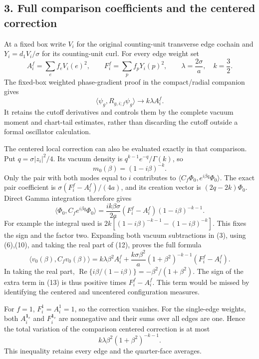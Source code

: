 \documentclass[
  11pt,
]{article}
\begin{document}
\subsection{3. Full comparison coefficients and the centered
correction}\label{weak-coupling-part-12-full-comparison-coefficients-and-the-centered-correction}

At a fixed box write \(V_i\) for the original counting-unit transverse
edge cochain and \(Y_i=d_1V_i/\sigma\) for its counting-unit curl. For
every edge weight set \[
 A_i^f=\sum_ef_eV_i(e)^2,\qquad
 F_i^f=\sum_pf_pY_i(p)^2,\qquad
 \lambda=\frac{2\sigma}{a},\quad k=\frac32 .
 \tag{9}
\] The fixed-box weighted phase-gradient proof in the compact/radial
companion gives \[
 \langle\psi_g,R_{g,i;f}\psi_g\rangle
                       \longrightarrow k\lambda A_i^f .
 \tag{10}
\] It retains the cutoff derivatives and controls them by the complete
vacuum moment and chart-tail estimates, rather than discarding the
cutoff outside a formal oscillator calculation.

The centered local correction can also be evaluated exactly in that
comparison. Put \(q=\sigma|z_i|^2/4\). Its vacuum density is
\(q^{k-1}e^{-q}/\Gamma(k)\), so \[
 m_0(\beta)=(1-i\beta)^{-k}.
 \tag{11}
\] Only the pair with both modes equal to \(i\) contributes to
\(\langle C_f\Phi_0,e^{i\beta q}\Phi_0\rangle\). The exact pair
coefficient is \(\sigma(F_i^f-A_i^f)/(4a)\), and its creation vector is
\((2q-2k)\Phi_0\). Direct Gamma integration therefore gives \[
 \langle\Phi_0,C_f e^{i\beta q}\Phi_0\rangle
 =\frac{ik\beta\sigma}{2a}(F_i^f-A_i^f)
                                      (1-i\beta)^{-k-1}.
 \tag{12}
\] For example the integral used is
\(2k[(1-i\beta)^{-k-1}-(1-i\beta)^{-k}]\). This fixes the sign and the
factor two. Expanding both vacuum subtractions in (3), using (6),(10),
and taking the real part of (12), proves the full formula \[
 \boxed{\langle v_0(\beta),C_fv_0(\beta)\rangle
   =k\lambda\beta^2 A_i^f+
       \frac{k\sigma\beta^2}{a}
          (1+\beta^2)^{-k-1}(F_i^f-A_i^f).}
 \tag{13}
\] In taking the real part, \(\operatorname{Re}\{i\beta/(1-i\beta)\}
 =-\beta^2/(1+\beta^2)\). The sign of the extra term in (13) is thus
positive times \(F_i^f-A_i^f\). This term would be missed by identifying
the centered and uncentered configuration measures.

For \(f=1\), \(F_i^1=A_i^1=1\), so the correction vanishes. For the
single-edge weights, both \(A_i^{\mathbf1_e}\) and \(F_i^{\mathbf1_e}\)
are nonnegative and their sums over all edges are one. Hence the total
variation of the comparison centered correction is at most \[
 k\lambda\beta^2(1+\beta^2)^{-k-1}.
 \tag{14}
\] This inequality retains every edge and the quarter-face averages.
\end{document}
